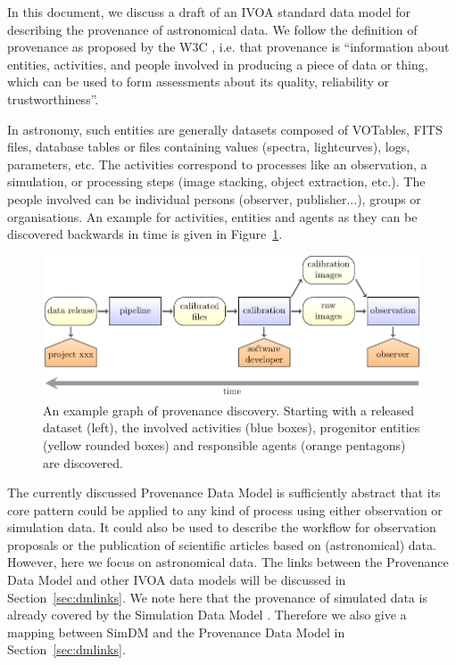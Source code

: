 
In this document, we discuss a draft of an IVOA standard data model for
describing the provenance of astronomical data. 
We follow the definition of provenance as proposed by the W3C \citep{std:W3CProvDM}, i.e. that provenance is ``information about entities, activities, and people involved in producing a piece of data or thing, which can be used to form assessments about its quality, reliability or trustworthiness''.

In astronomy, such entities are generally datasets composed of VOTables, FITS files, database tables or files containing values (spectra, lightcurves), logs, parameters, etc. The activities correspond to processes like an observation, a simulation, or processing steps (image stacking, object extraction, etc.). The people involved can be individual persons (observer, publisher...), groups or organisations.
An example for activities, entities and agents as they can be discovered backwards in time is given in Figure~\ref{fig:example-workflow}.

\begin{figure}[h]
\centering
\includegraphics[width=1\textwidth]{workflow-backwards.pdf}
\caption{An example graph of provenance discovery. Starting with a released dataset (left), the involved activities (blue boxes), 
progenitor entities (yellow rounded boxes) and responsible agents (orange pentagons) are 
discovered.}
\label{fig:example-workflow}
\end{figure}


The currently discussed Provenance Data Model is sufficiently abstract that its core pattern could be applied to any kind of process using either observation or simulation data.
It could also be used to describe the workflow for observation proposals or the publication of scientific articles based on (astronomical) data. However, here we focus on astronomical data. The links between the Provenance Data Model and other IVOA data models 
will be discussed in Section~\ref{sec:dmlinks}. We note here that the provenance of simulated data is already covered by the Simulation Data Model
\citep[SimDM,][]{std:SimDM}. Therefore we also give a mapping between SimDM and the Provenance Data Model in Section~\ref{sec:dmlinks}.


